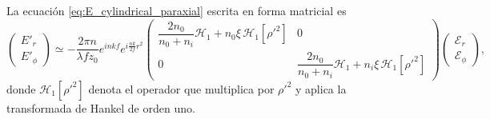 La ecuación \eqref{eq:E_cylindrical_paraxial} escrita en forma matricial es
\begin{equation}
\begin{pmatrix}
E'_r\\
E'_\phi
\end{pmatrix}
\simeq
-\frac{2\pi n}{\lambda f z_0}
e^{inkf}
e^{i\frac{nk}{2f}r^2}
\begin{pmatrix}
\dfrac{2n_0}{n_0+n_i}\mathscr H_1+n_0\xi\,\mathscr H_1[\rho'^2]
&
0
\\[0.8em]
0
&
\dfrac{2n_0}{n_0+n_i}\mathscr H_1+n_i\xi\,\mathscr H_1[\rho'^2]
\end{pmatrix}
\begin{pmatrix}
\mathscr E_r\\
\mathscr E_\phi
\end{pmatrix},
\label{eq:E_cylindrical_paraxial_matrix}
\end{equation}
donde $\mathscr H_1[\rho'^2]$ denota el operador que multiplica por $\rho'^2$ y aplica la transformada de Hankel de orden uno.

